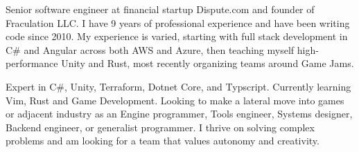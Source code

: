 

\begin{cvparagraph}

Senior software engineer at financial startup Dispute.com and founder of Fraculation LLC.\@
I have 9 years of professional experience and have been writing code since 2010. My experience is varied, starting with 
full stack development in C\# and Angular across both AWS and Azure, then teaching myself high-performance Unity and Rust,
most recently organizing teams around Game Jams.

Expert in C\#, Unity, Terraform, Dotnet Core, and Typscript. Currently learning Vim, Rust and Game Development. 
Looking to make a lateral move into games or adjacent industry as an Engine programmer, 
Tools engineer,  Systems designer, Backend engineer, or generalist programmer.
I thrive on solving complex problems and am looking for a team that values autonomy and creativity.

\end{cvparagraph}
